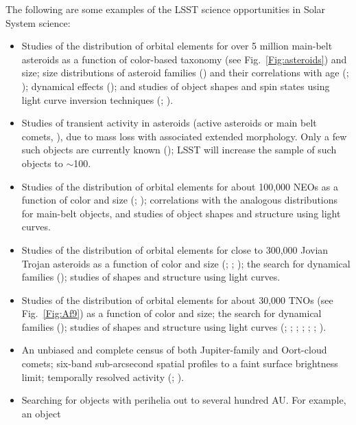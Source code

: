 The following are some examples of the LSST science opportunities in
Solar System science:
\begin{itemize}
\item Studies of the distribution of orbital elements for over 5 million main-belt
asteroids as a function of color-based taxonomy (see Fig.~\ref{Fig:asteroids})
and size; size distributions of asteroid families (\cite{2008Icar..198..138P}) and their
correlations with age (\cite{2004Natur.429..275J}; \cite{2005Icar..173..132N}); dynamical
effects (\cite{2001Sci...294.1693B}); and studies of object shapes and spin states using
light curve inversion techniques (\cite{2000Icar..148...12P}; \cite{2009A&A...493..291D}).
\item Studies of transient activity in asteroids (active asteroids or main belt comets,
\cite{2006Sci...312..561H}),  due to mass loss with associated extended
morphology.  Only a few such objects are currently known (\cite{2011AJ....142...28J,2012AJ....143...66J});
LSST
will increase the sample of such objects to $\sim$100.
\item Studies of the distribution of orbital elements for about 100,000 NEOs as a
function of color and size (\cite{1993ApJ...407..412R}; \cite{2003Icar..163..363D});
correlations with the analogous distributions for
main-belt objects, and studies of object shapes and structure using light curves.
\item Studies of the distribution of orbital elements for close to 300,000 Jovian Trojan
asteroids as a function of color and size (\cite{2000AJ....120.1140J}; \cite{2005AJ....130.2900Y};
\cite{2007MNRAS.377.1393S}); the search for dynamical families
(\cite{2005HiA....13..758K}); studies of shapes and structure using light curves.
\item Studies of the distribution of orbital elements for about 30,000 TNOs (see
Fig.~\ref{Fig:Af9}) as a function of color and size; the search for dynamical families
(\cite{2011ApJ...733...40M}); studies of shapes and structure using light curves (\cite{1995AJ....110.3073D};
\cite{2001AJ....122..457T}; \cite{2001AJ....122.1051G}; \cite{2004AJ....128.1364B};
\cite{2005AJ....129.1117E}; \cite{2006Icar..185..508J}; \cite{2007AJ....134.2186D}).
\item An unbiased and complete census of both Jupiter-family and Oort-cloud
comets; six-band sub-arcsecond spatial profiles to a faint surface brightness
limit; temporally resolved activity (\cite{1999A&A...349..649L}; \cite{2004come.book...17A}).
\item Searching for objects with perihelia out to several hundred AU. For example, an object

\end{itemize}
